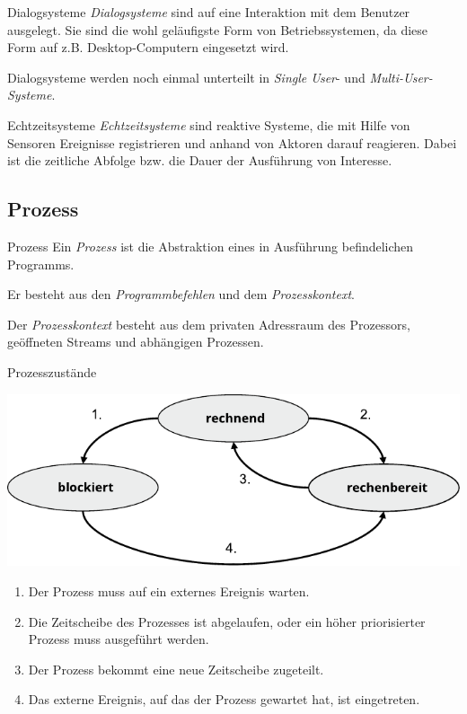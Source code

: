 \begin{bonus}{Dialogsysteme}
    \emph{Dialogsysteme} sind auf eine Interaktion mit dem Benutzer ausgelegt.
    Sie sind die wohl geläufigste Form von Betriebssystemen, da diese Form auf z.B. Desktop-Computern eingesetzt wird.

    Dialogsysteme werden noch einmal unterteilt in \emph{Single User}- und \emph{Multi-User-Systeme}.
\end{bonus}

\begin{bonus}{Echtzeitsysteme}
    \emph{Echtzeitsysteme} sind reaktive Systeme, die mit Hilfe von Sensoren Ereignisse registrieren und anhand von Aktoren darauf reagieren.
    Dabei ist die zeitliche Abfolge bzw. die Dauer der Ausführung von Interesse.
\end{bonus}

\subsection{Prozess}

\begin{defi}{Prozess}
    Ein \emph{Prozess} ist die Abstraktion eines in Ausführung befindelichen Programms.

    Er besteht aus den \emph{Programmbefehlen} und dem \emph{Prozesskontext}.

    Der \emph{Prozesskontext} besteht aus dem privaten Adressraum des Prozessors, geöffneten Streams und abhängigen Prozessen.
\end{defi}

\begin{defi}{Prozesszustände}
    \begin{center}
        \includegraphics[]{images/prozesszustaende.pdf}
    \end{center}
    \begin{enumerate}
        \item Der Prozess muss auf ein externes Ereignis warten.
        \item Die Zeitscheibe des Prozesses ist abgelaufen, oder ein höher priorisierter Prozess muss ausgeführt werden.
        \item Der Prozess bekommt eine neue Zeitscheibe zugeteilt.
        \item Das externe Ereignis, auf das der Prozess gewartet hat, ist eingetreten.
    \end{enumerate}
\end{defi}

